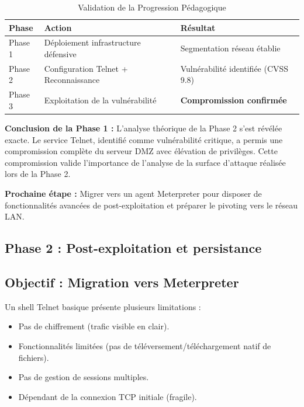 \documentclass[12pt,a4paper,openany]{report}
\newcommand{\tableheadcolor}{\rowcolor{tableheadbg}}
\begin{document}
	\begin{table}[H]
		\centering
		\small
		\renewcommand{\arraystretch}{1.4}
		\setlength{\arrayrulewidth}{0.5pt}
		\begin{tabular}{p{2.5cm} p{5cm} p{5cm}}
			\arrayrulecolor{tableborder}
			\hline
			\tableheadcolor
			\textcolor{tableheadfg}{\textbf{Phase}} &
			\textcolor{tableheadfg}{\textbf{Action}} &
			\textcolor{tableheadfg}{\textbf{Résultat}} \\
			\hline
			\rowcolor{tablerowalt}
			Phase 1 & Déploiement infrastructure défensive & Segmentation réseau établie \\
			
			Phase 2 & Configuration Telnet + Reconnaissance & Vulnérabilité identifiée (CVSS 9.8) \\
			
			\rowcolor{tablerowalt}
			Phase 3 & Exploitation de la vulnérabilité & \textcolor{accent}{\textbf{Compromission confirmée}} \\
			\hline
		\end{tabular}
		\caption{Validation de la Progression Pédagogique}
		\label{tab:progression-validation}
	\end{table}
	
	\textbf{Conclusion de la Phase 1 :} L'analyse théorique de la Phase 2 s'est révélée exacte. Le service Telnet, identifié comme vulnérabilité critique, a permis une compromission complète du serveur DMZ avec élévation de privilèges. Cette compromission valide l'importance de l'analyse de la surface d'attaque réalisée lors de la Phase 2.
	
	\textbf{Prochaine étape :} Migrer vers un agent Meterpreter pour disposer de fonctionnalités avancées de post-exploitation et préparer le pivoting vers le réseau LAN.
	
	\subsection{Phase 2 : Post-exploitation et persistance}
	
	\subsection{Objectif : Migration vers Meterpreter}
	
	Un shell Telnet basique présente plusieurs limitations :
	\begin{itemize}
		\item Pas de chiffrement (trafic visible en clair).
		\item Fonctionnalités limitées (pas de téléversement/téléchargement natif de fichiers).
		\item Pas de gestion de sessions multiples.
		\item Dépendant de la connexion TCP initiale (fragile).
	\end{itemize}
	
\end{document}
